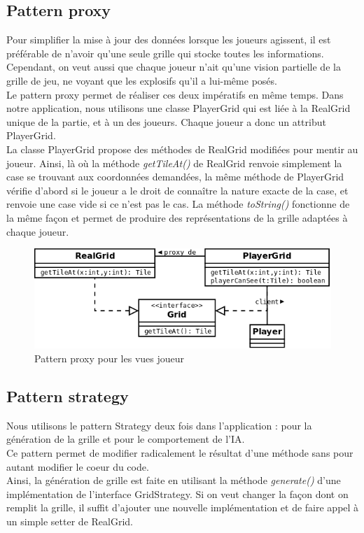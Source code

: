 \documentclass[a4paper,12pt]{article} %
\begin{document}
\subsection{Pattern proxy}

Pour simplifier la mise à jour des données lorsque les joueurs agissent, il est préférable de n'avoir qu'une seule grille qui stocke toutes les informations. Cependant, on veut aussi que chaque joueur n'ait qu'une vision partielle de la grille de jeu, ne voyant que les explosifs qu'il a lui-même posés.\\
Le pattern proxy permet de réaliser ces deux impératifs en même temps. Dans notre application, nous utilisons une classe PlayerGrid qui est liée à la RealGrid unique de la partie, et à un des joueurs. Chaque joueur a donc un attribut PlayerGrid.\\
La classe PlayerGrid propose des méthodes de RealGrid modifiées pour mentir au joueur. Ainsi, là où la méthode \textit{getTileAt()} de RealGrid renvoie simplement la case se trouvant aux coordonnées demandées, la même méthode de PlayerGrid vérifie d'abord si le joueur a le droit de connaître la nature exacte de la case, et renvoie une case vide si ce n'est pas le cas. La méthode \textit{toString()} fonctionne de la même façon et permet de produire des représentations de la grille adaptées à chaque joueur.

\begin{figure}[!h]
\centering
\includegraphics[scale=0.3]{images/proxy.png}
\caption{Pattern proxy pour les vues joueur}
\end{figure}

\subsection{Pattern strategy}

Nous utilisons le pattern Strategy deux fois dans l'application : pour la génération de la grille et pour le comportement de l'IA.\\
Ce pattern permet de modifier radicalement le résultat d'une méthode sans pour autant modifier le coeur du code.\\
Ainsi, la génération de grille est faite en utilisant la méthode \textit{generate()} d'une implémentation de l'interface GridStrategy. Si on veut changer la façon dont on remplit la grille, il suffit d'ajouter une nouvelle implémentation et de faire appel à un simple setter de RealGrid.
\end{document}
